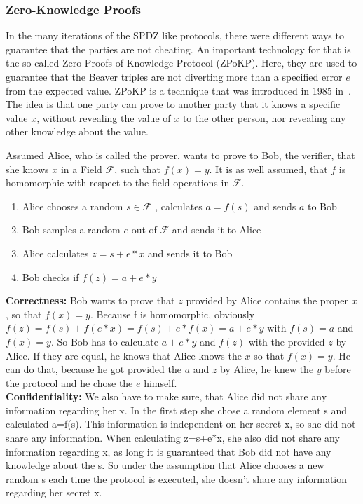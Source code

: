\documentclass[english,runningheads,a4paper]{llncs}[2018/03/10]
\begin{document}
\subsubsection{Zero-Knowledge Proofs}
In the many iterations of the SPDZ like protocols, there were different ways to guarantee that the parties are not cheating. An important technology for that is the so called Zero Proofs of Knowledge Protocol (ZPoKP). Here, they are used to guarantee that the Beaver triples are not diverting more than a specified error \(e\) from the expected value. ZPoKP is a technique that was introduced  in 1985 in~\cite{Goldwasser:1985:KCI:22145.22178}. The idea is that one party can prove to another party that it knows a specific value \(x\), without revealing the value of \(x\) to the other person, nor revealing any other knowledge about the value. 

Assumed Alice, who is called the prover, wants to prove to Bob, the verifier, that she knows \( x\) in a Field \( \mathcal{F} \), such that \(f(x)=y\). It is as well assumed, that \( f \) is homomorphic with respect to the field operations in  \( \mathcal{F} \).
\begin{enumerate}
\item Alice chooses a random \( s \in \mathcal{F} \) , calculates \( a = f(s)\) and sends \( a\) to Bob
\item Bob samples a random  \( e \) out of  \( \mathcal{F} \) and sends it to Alice
\item Alice calculates \( z=s+e*x\) and sends it to Bob
\item Bob checks if \( f(z)=a+e*y\)
\end{enumerate}

\textbf{Correctness:}
Bob wants to prove that \( z\) provided by Alice contains the proper \( x\), so that \( f(x)=y\). 
Because f is homomorphic, obviously \( f(z)=f(s)+f(e*x)=f(s)+e*f(x)=a+e*y\) with \(f(s)=a\) and \(f(x)=y\).
So Bob has to calculate \( a+e*y\) and \( f(z)\) with the provided \( z\) by Alice. If they are equal, he knows that Alice knows the \( x\) so that \( f(x)=y\).
He can do that, because he got provided the \( a\) and \( z\) by Alice, he knew the \( y\) before the protocol and he chose the \( e\) himself.\\

\textbf{Confidentiality:}
We also have to make sure, that Alice did not share any information regarding her x.
In the first step she chose a random element s and calculated a=f(s). This information is independent on her secret x, so she did not share any information.
When calculating z=s+e*x, she also did not share any information regarding x, as long it is guaranteed that Bob did not have any knowledge about the s.
So under the assumption that Alice chooses a new random s each time the protocol is executed, she doesn't share any information regarding her secret x.\\
\end{document}
